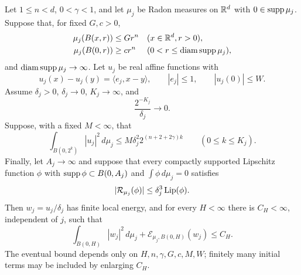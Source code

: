 \begin{lemma}
\label{lem:height-energy}
Let $1\le n<d$, $0<\gamma<1$, and let $\mu_j$ be Radon measures on $\mathbb R^d$
with $0\in\operatorname{supp}\mu_j$.  Suppose that, for fixed $G,c>0$,
\begin{align}
 \mu_j(B(x,r))&\le Gr^n
       &&(x\in\mathbb R^d, r>0),\notag\\
 \mu_j(B(0,r))&\ge cr^n
       &&(0<r\le\operatorname{diam}\operatorname{supp}\mu_j),
 \label{eq:height-growth}
\end{align}
and $\operatorname{diam}\operatorname{supp}\mu_j\to\infty$.
Let $u_j$ be real affine functions with
\begin{equation}
 u_j(x)-u_j(y)=\langle e_j,x-y\rangle,
 \qquad |e_j|\le1,\qquad |u_j(0)|\le W.
 \label{eq:height-affine-data}
\end{equation}
Assume $\delta_j>0$, $\delta_j\to0$, $K_j\to\infty$, and
\begin{equation}
 \frac{2^{-K_j}}{\delta_j}\longrightarrow0.
 \label{eq:height-last-radius}
\end{equation}
Suppose, with a fixed $M<\infty$, that
\begin{equation}
 \int_{B(0,2^k)}|u_j|^2\,d\mu_j
 \le M\delta_j^2 2^{(n+2+2\gamma)k}
 \qquad(0\le k\le K_j).
 \label{eq:height-dyadic-moments}
\end{equation}
Finally, let $A_j\to\infty$ and suppose that every compactly supported
Lipschitz function $\phi$ with
$\operatorname{supp}\phi\subset B(0,A_j)$ and $\int\phi\,d\mu_j=0$ satisfies
\begin{equation}
 |\mathcal R_{\mu_j}(\phi)|
       \le \delta_j^3\operatorname{Lip}(\phi).
 \label{eq:height-small-oscillation}
\end{equation}
Then $w_j=u_j/\delta_j$ has finite local energy, and for every
$H<\infty$ there is $C_H<\infty$, independent of $j$, such that
\begin{equation}
 \int_{B(0,H)}|w_j|^2\,d\mu_j
       +\mathcal E_{\mu_j,B(0,H)}(w_j)\le C_H.
 \label{eq:height-uniform-energy}
\end{equation}
The eventual bound depends only on $H,n,\gamma,G,c,M,W$; finitely many
initial terms may be included by enlarging $C_H$.
\end{lemma}

